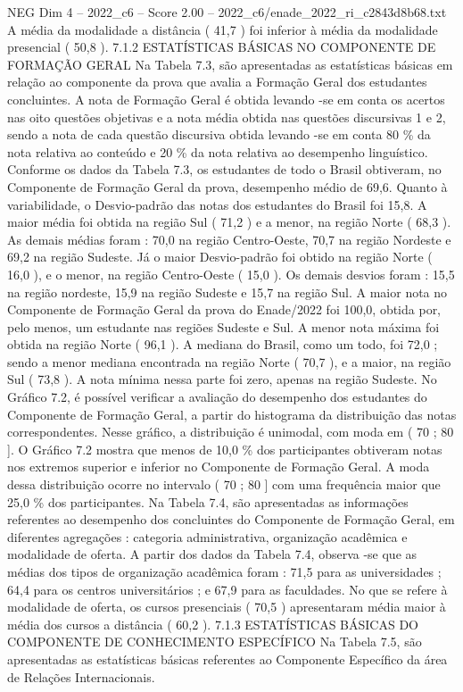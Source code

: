 \begin{textsample}{NEG Dim 4 – 2022\_c6 – Score 2.00 – 2022\_c6/enade\_2022\_ri\_c2843d8b68.txt}
A média da modalidade a distância ( 41,7 ) foi inferior à média da modalidade presencial ( 50,8 ). 7.1.2 ESTATÍSTICAS BÁSICAS NO COMPONENTE DE FORMAÇÃO GERAL Na Tabela 7.3, são apresentadas as estatísticas básicas em relação ao componente da prova que avalia a Formação Geral dos estudantes concluintes.
A nota de Formação Geral é obtida levando -se em conta os acertos nas oito questões objetivas e a nota média obtida nas questões discursivas 1 e 2, sendo a nota de cada questão discursiva obtida levando -se em conta 80 \% da nota relativa ao conteúdo e 20 \% da nota relativa ao desempenho linguístico.
Conforme os dados da Tabela 7.3, os estudantes de todo o Brasil obtiveram, no Componente de Formação Geral da prova, desempenho médio de 69,6.
Quanto à variabilidade, o Desvio-padrão das notas dos estudantes do Brasil foi 15,8.
A maior média foi obtida na região Sul ( 71,2 ) e a menor, na região Norte ( 68,3 ).
As demais médias foram : 70,0 na região Centro-Oeste, 70,7 na região Nordeste e 69,2 na região Sudeste.
Já o maior Desvio-padrão foi obtido na região Norte ( 16,0 ), e o menor, na região Centro-Oeste ( 15,0 ).
Os demais desvios foram : 15,5 na região nordeste, 15,9 na região Sudeste e 15,7 na região Sul.
A maior nota no Componente de Formação Geral da prova do Enade/2022 foi 100,0, obtida por, pelo menos, um estudante nas regiões Sudeste e Sul.
A menor nota máxima foi obtida na região Norte ( 96,1 ).
A mediana do Brasil, como um todo, foi 72,0 ; sendo a menor mediana encontrada na região Norte ( 70,7 ), e a maior, na região Sul ( 73,8 ).
A nota mínima nessa parte foi zero, apenas na região Sudeste.
No Gráfico 7.2, é possível verificar a avaliação do desempenho dos estudantes do Componente de Formação Geral, a partir do histograma da distribuição das notas correspondentes.
Nesse gráfico, a distribuição é unimodal, com moda em ( 70 ; 80 ].
O Gráfico 7.2 mostra que menos de 10,0 \% dos participantes obtiveram notas nos extremos superior e inferior no Componente de Formação Geral.
A moda dessa distribuição ocorre no intervalo ( 70 ; 80 ] com uma frequência maior que 25,0 \% dos participantes.
Na Tabela 7.4, são apresentadas as informações referentes ao desempenho dos concluintes do Componente de Formação Geral, em diferentes agregações : categoria administrativa, organização acadêmica e modalidade de oferta.
A partir dos dados da Tabela 7.4, observa -se que as médias dos tipos de organização acadêmica foram : 71,5 para as universidades ; 64,4 para os centros universitários ; e 67,9 para as faculdades.
No que se refere à modalidade de oferta, os cursos presenciais ( 70,5 ) apresentaram média maior à média dos cursos a distância ( 60,2 ). 7.1.3 ESTATÍSTICAS BÁSICAS DO COMPONENTE DE CONHECIMENTO ESPECÍFICO Na Tabela 7.5, são apresentadas as estatísticas básicas referentes ao Componente Específico da área de Relações Internacionais.

\end{textsample}
